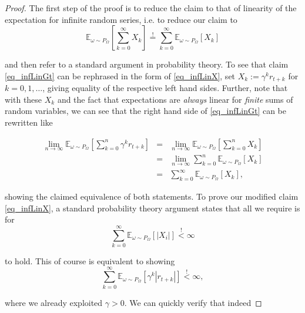 \documentclass[11pt]{article} %
\begin{document}
\begin{proof}
	The first step of the proof is to reduce the claim to that of linearity of the expectation for infinite random series, i.e. to reduce our claim to 
	\begin{equation}\label{eq_infLinX}
		\mathbb{E}_{\omega \sim P_\Omega}\left[ \sum_{k=0}^{\infty} X_k \right] \overset{!}{=} \sum_{k=0}^{\infty} \mathbb{E}_{\omega \sim P_\Omega}\left[ X_k \right]
	\end{equation}

	and then refer to a standard argument in probability theory. To see that claim \ref{eq_infLinGt} can be rephrased in the form of \ref{eq_infLinX}, set $X_k := \gamma^k r_{t+k}$ for $k=0,1,\dots$, giving equality of the respective left hand sides. Further, note that with these $X_k$ and the fact that expectations are \textit{always} linear for \textit{finite} sums of random variables, we can see that the right hand side of \ref{eq_infLinGt} can be rewritten like

	\begin{equation}
		\begin{array}{rcl}
		\lim_{n \rightarrow \infty} \mathbb{E}_{\omega \sim P_\Omega}\left[ \sum_{k=0}^n \gamma^k r_{t+k} \right] & = & \lim_{n \rightarrow \infty} \mathbb{E}_{\omega \sim P_\Omega}\left[ \sum_{k=0}^n X_k \right] \\
			& = & \lim_{n \rightarrow \infty} \sum_{k=0}^n \mathbb{E}_{\omega \sim P_\Omega}\left[  X_k \right] \\
			& = & \sum_{k=0}^{\infty} \mathbb{E}_{\omega \sim P_\Omega}\left[ X_k \right],
		\end{array}
	\end{equation}

	showing the claimed equivalence of both statements. To prove our modified claim \ref{eq_infLinX}, a standard probability theory argument states that all we require is for 
	\begin{equation}
		\sum_{k=0}^{\infty} \mathbb{E}_{\omega \sim P_\Omega}\left[ | X_i | \right] \overset{!}{<} \infty
	\end{equation}

	to hold. This of course is equivalent to showing 
	\begin{equation}\label{eq_finiteInfDiscExp}
		\sum_{k=0}^{\infty} \mathbb{E}_{\omega \sim P_\Omega}\left[ \gamma^k | r_{t+k} | \right] \overset{!}{<} \infty,
	\end{equation}

	where we already exploited $\gamma > 0$. We can quickly verify that indeed


\end{proof}
\end{document}
